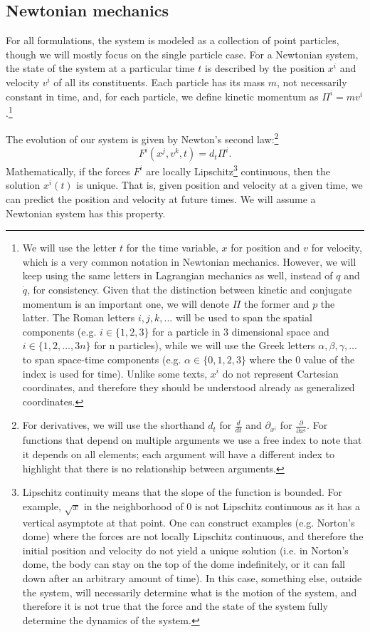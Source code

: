 \subsection{Newtonian mechanics}

For all formulations, the system is modeled as a collection of point particles, though we will mostly focus on the single particle case. For a Newtonian system, the state of the system at a particular time $t$ is described by the position $x^i$ and velocity $v^i$ of all its constituents. Each particle has its mass $m$, not necessarily constant in time, and, for each particle, we define kinetic momentum as $\Pi^i = m v^i$.\footnote{We will use the letter $t$ for the time variable, $x$ for position and $v$ for velocity, which is a very common notation in Newtonian mechanics. However, we will keep using the same letters in Lagrangian mechanics as well, instead of $q$ and $\dot{q}$, for consistency. Given that the distinction between kinetic and conjugate momentum is an important one, we will denote $\Pi$ the former and $p$ the latter. The Roman letters $i,j,k,...$ will be used to span the spatial components (e.g. $i \in \{1,2,3\}$ for a particle in 3 dimensional space and $i \in \{1,2,\dots, 3n\}$ for n particles), while we will use the Greek letters $\alpha, \beta, \gamma, ...$ to span space-time components (e.g. $\alpha \in \{0,1,2,3\}$ where the $0$ value of the index is used for time). Unlike some texts, $x^i$ do not represent Cartesian coordinates, and therefore they should be understood already as generalized coordinates.}

The evolution of our system is given by Newton's second law:\footnote{For derivatives, we will use the shorthand $d_t$ for $\frac{d}{dt}$ and $\partial_{x^i}$ for $\frac{\partial}{\partial x^i}$. For functions that depend on multiple arguments we use a free index to note that it depends on all elements; each argument will have a different index to highlight that there is no relationship between arguments. }
\begin{equation}\label{rp-cm-NewtonsSecondLaw}
	F^i(x^j, v^k, t) = d_t \Pi^i.
\end{equation}
Mathematically, if the forces $F^i$ are locally Lipschitz\footnote{Lipschitz continuity means that the slope of the function is bounded. For example, $\sqrt{x}$ in the neighborhood of $0$ is not Lipschitz continuous as it has a vertical asymptote at that point. One can construct examples (e.g. Norton's dome) where the forces are not locally Lipschitz continuous, and therefore the initial position and velocity do not yield a unique solution (i.e. in Norton's dome, the body can stay on the top of the dome indefinitely, or it can fall down after an arbitrary amount of time). In this case, something else, outside the system, will necessarily determine what is the motion of the system, and therefore it is not true that the force and the state of the system fully determine the dynamics of the system.} continuous, then the solution $x^i(t)$ is unique. That is, given position and velocity at a given time, we can predict the position and velocity at future times. We will assume a Newtonian system has this property.

